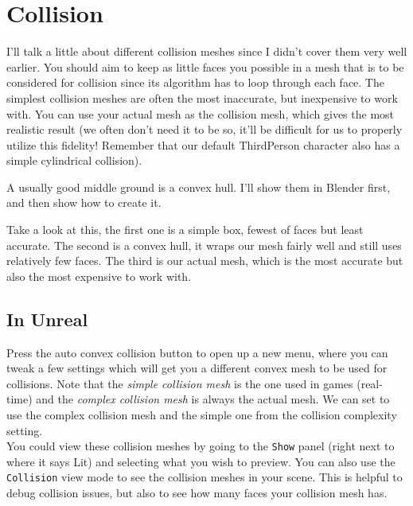 \documentclass{article}
\begin{document}
	\section{Collision}
	I'll talk a little about different collision meshes since I didn't cover them very well earlier. You should aim to keep as little faces you possible in a mesh that is to be considered for collision since its algorithm has to loop through each face. The simplest collision meshes are often the most inaccurate, but inexpensive to work with. You can use your actual mesh as the collision mesh, which gives the most realistic result (we often don't need it to be so, it'll be difficult for us to properly utilize this fidelity! Remember that our default ThirdPerson character also has a simple cylindrical collision).
	
	A usually good middle ground is a convex hull. I'll show them in Blender first, and then show how to create it.

	Take a look at this, the first one is a simple box, fewest of faces but least accurate. The second is a convex hull, it wraps our mesh fairly well and still uses relatively few faces. The third is our actual mesh, which is the most accurate but also the most expensive to work with.

	\subsection{In Unreal}

	Press the auto convex collision button to open up a new menu, where you can tweak a few settings which will get you a different convex mesh to be used for collisions. Note that the \emph{simple collision mesh} is the one used in games (real-time) and the \emph{complex collision mesh} is always the actual mesh. We can set to use the complex collision mesh and the simple one from the collision complexity setting. \\[10pt]
	You could view these collision meshes by going to the \verb|Show| panel (right next to where it says Lit) and selecting what you wish to preview. You can also use the \verb|Collision| view mode to see the collision meshes in your scene. This is helpful to debug collision issues, but also to see how many faces your collision mesh has.
\end{document}
